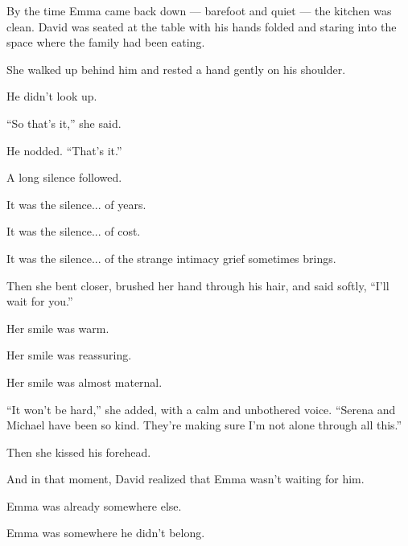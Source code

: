 By the time Emma came back down --- barefoot and quiet --- the kitchen was clean.
David was seated at the table with his hands folded and staring into the space where the
family had been eating.

She walked up behind him and rested a hand gently on his shoulder.

He didn’t look up.

``So that’s it,'' she said.

He nodded. ``That’s it.''

A long silence followed. 

It was the silence... of years. 

It was the silence... of cost. 

It was the silence... of the strange intimacy grief sometimes brings.

Then she bent closer, brushed her hand through his hair, and said softly,  
``I’ll wait for you.''

Her smile was warm. 

Her smile was reassuring. 

Her smile was almost maternal.  

``It won’t be hard,'' she added, with a calm and unbothered voice.
``Serena and Michael have been so kind. They’re making sure I’m not alone through all this.''

Then she kissed his forehead.

And in that moment, David realized that 
Emma wasn’t waiting for him.  

Emma was already somewhere else.  

Emma was somewhere he didn't belong.

\medskip

